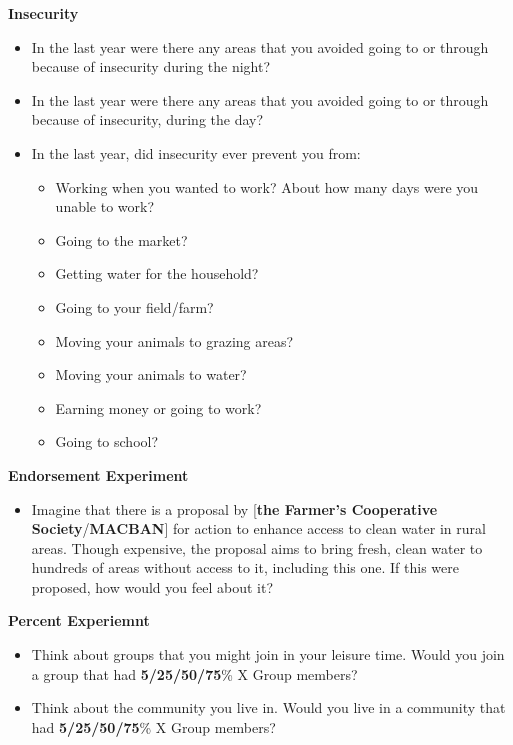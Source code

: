 \documentclass[
]{article}
\providecommand{\tightlist}{%
  \setlength{\itemsep}{0pt}\setlength{\parskip}{0pt}}
\begin{document}
\textbf{Insecurity}

\begin{itemize}
\tightlist
\item
  In the last year were there any areas that you avoided going to or
  through because of insecurity during the night?
\item
  In the last year were there any areas that you avoided going to or
  through because of insecurity, during the day?
\item
  In the last year, did insecurity ever prevent you from:

  \begin{itemize}
  \tightlist
  \item
    Working when you wanted to work? About how many days were you unable
    to work?
  \item
    Going to the market?
  \item
    Getting water for the household?
  \item
    Going to your field/farm?
  \item
    Moving your animals to grazing areas?
  \item
    Moving your animals to water?
  \item
    Earning money or going to work?
  \item
    Going to school?
  \end{itemize}
\end{itemize}

\textbf{Endorsement Experiment}

\begin{itemize}
\tightlist
\item
  Imagine that there is a proposal by {[}\textbf{the Farmer's
  Cooperative Society}/\textbf{MACBAN}{]} for action to enhance access
  to clean water in rural areas. Though expensive, the proposal aims to
  bring fresh, clean water to hundreds of areas without access to it,
  including this one. If this were proposed, how would you feel about
  it?
\end{itemize}

\textbf{Percent Experiemnt}

\begin{itemize}
\tightlist
\item
  Think about groups that you might join in your leisure time. Would you
  join a group that had \textbf{5/25/50/75}\% X Group members?
\item
  Think about the community you live in. Would you live in a community
  that had \textbf{5/25/50/75}\% X Group members?
\end{itemize}
\end{document}
